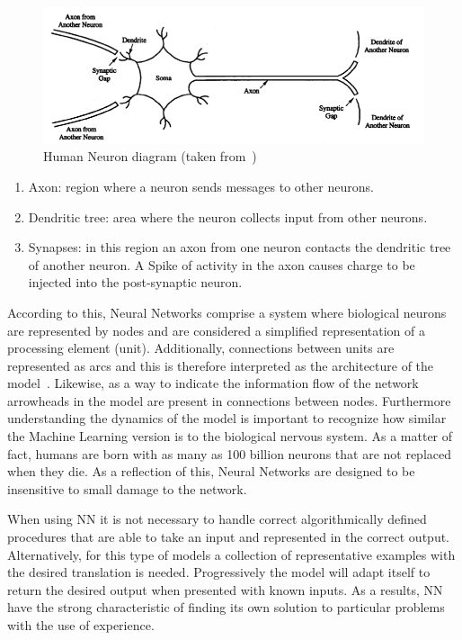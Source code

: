 \begin{figure}[htbp]
  \centering
  \includegraphics[width=\textwidth]{images/neuron}
  \caption{ Human Neuron diagram (taken from~\cite{fausett93}) }
  \label{fig:humanNeuron}
\end{figure}

\begin{enumerate}
 \item Axon:  region where a neuron sends messages to other neurons.
 \item Dendritic tree: area where the neuron collects input from other neurons.
 \item Synapses: in this region an axon from one neuron contacts the dendritic tree of another neuron. A Spike of activity in the axon causes charge to be injected into the post-synaptic neuron.
\end{enumerate}

According to this, Neural Networks comprise a system where biological neurons are represented by nodes and are considered a simplified representation of a processing element (unit). Additionally, connections between units are represented as arcs and this is therefore interpreted as the architecture of the model~\cite{fausett93}. Likewise, as a way to indicate the information flow of the network arrowheads in the model are present in connections between nodes. Furthermore understanding the dynamics of the model is important to recognize how similar the Machine Learning version is to the biological nervous system. As a matter of fact, humans are born with as many as 100 billion neurons that are not replaced when they die. As a reflection of this, Neural Networks are designed to be insensitive to small damage to the network. 

When using  \ac{NN}  it is not necessary to handle correct algorithmically defined procedures that are able to take an input and represented in the correct output. Alternatively, for this type of models a collection of representative examples with the desired translation is needed. Progressively the model will adapt itself to return the desired output when presented with known inputs. As a results, \ac{NN}  have the strong characteristic of finding its  own solution to particular problems with the use of experience. 

